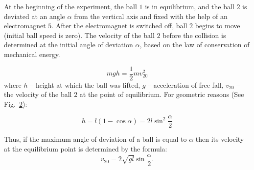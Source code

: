 \documentclass{LabWorkEng}
\begin{document}
\begin{figure}
\begin{subfigure}[t]{0.5\linewidth}
\begin{picbox}
	\end{picbox}
	\label{theory}
	\end{subfigure}
\end{figure}

At the beginning of the experiment, the ball $1$ is in equilibrium, and the ball $2$ is deviated at an angle $\alpha$ from the vertical axis and fixed with the help of an electromagnet $5$. After the electromagnet is switched off, ball $2$ begins to move (initial ball speed is zero). The velocity of the ball $2$ before the collision is determined at the initial angle of deviation $\alpha$, based on the law of conservation of mechanical energy.

\begin{equation}\label{12}
	mgh = \frac{1}{2}mv_{20}^2
\end{equation}
where $h$ -- height at which the ball was lifted, $g$ -- acceleration of free fall, $v_{20}$ -- the velocity of the ball $2$ at the point of equilibrium. For geometric reasons (See Fig.~\ref{theory}):

\begin{equation}\label{13}
	h = l(1 - \cos \alpha) = 2l{\sin ^2}\frac{\alpha }{2}
\end{equation}

Thus, if the maximum angle of deviation of a ball is equal to $\alpha$ then its velocity at the equilibrium point is determined by the formula:
\begin{equation}\label{14}
	v_{20} = 2\sqrt{gl} \sin\frac{\alpha}{2}.
\end{equation}
\end{document}
